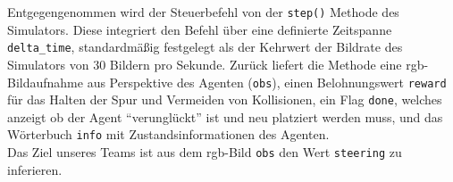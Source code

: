 Entgegengenommen wird der Steuerbefehl von der \texttt{step()} Methode des Simulators. Diese integriert den Befehl über eine definierte Zeitspanne \texttt{delta\_time}, standardmäßig festgelegt als der Kehrwert der Bildrate des Simulators von 30 Bildern pro Sekunde. Zurück liefert die Methode eine \acs{rgb}-Bildaufnahme aus Perspektive des Agenten (\texttt{obs}), einen Belohnungswert \texttt{reward} für das Halten der Spur und Vermeiden von Kollisionen, ein Flag \texttt{done}, welches anzeigt ob der Agent ``verunglückt'' ist und neu platziert werden muss, und das Wörterbuch \texttt{info} mit Zustandsinformationen des Agenten.\\

Das Ziel unseres Teams ist aus dem \acs{rgb}-Bild \texttt{obs} den Wert \texttt{steering} zu inferieren.